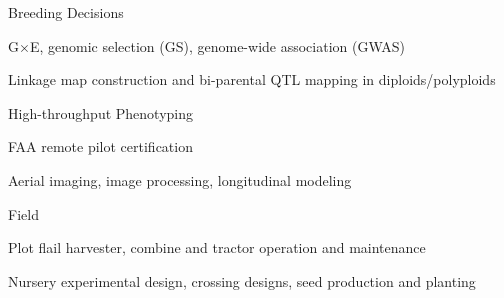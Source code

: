 \documentclass[10pt]{article}
\newcommand{\halfblankline}{\quad\vspace{-0.5\baselineskip}\pagebreak[3]}
\begin{document}


\halfblankline

Breeding Decisions
%
\begin{innerlist}
    \item G$\times$E, genomic selection (GS), genome-wide association (GWAS)
	\item Linkage map construction and bi-parental QTL mapping in diploids/polyploids
\end{innerlist}

\halfblankline 

High-throughput Phenotyping
\begin{innerlist}
\item FAA remote pilot certification
\item Aerial imaging, image processing, longitudinal modeling 
\end{innerlist}

\halfblankline

Field
%
\begin{innerlist}
\item Plot flail harvester, combine and tractor operation and maintenance
\item Nursery experimental design, crossing designs, seed production and planting 
\end{innerlist}
\end{document}
